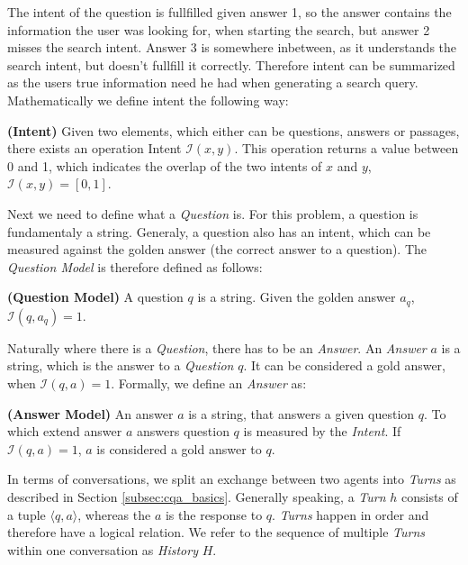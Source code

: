 The intent of the question is fullfilled given answer 1, so the answer contains the information the user was looking for, when starting the search, but answer 2 misses the search intent. Answer 3 is somewhere inbetween, as it understands the search intent, but doesn't fullfill it correctly. Therefore intent can be summarized as the users true information need he had when generating a search query. Mathematically we define intent the following way:

\begin{definition}
    \textbf{(Intent)} Given two elements, which either can be questions, answers or passages, there exists an operation Intent $\mathcal{I}(x, y)$. This operation returns a value between 0 and 1, which indicates the overlap of the two intents of $x$ and $y$, $\mathcal{I}(x, y) = [0,1]$.
    \label{def:intent}
\end{definition}

Next we need to define what a \textit{Question} is. For this problem, a question is fundamentaly a string. Generaly, a question also has an intent, which can be measured against the golden answer (the correct answer to a question). The \textit{Question Model} is therefore defined as follows:

\begin{definition}
    \textbf{(Question Model)} A question $q$ is a string. Given the golden answer $a_q$, $\mathcal{I}(q, a_q) = 1$.
    \label{def:question_model}
\end{definition}

Naturally where there is a \textit{Question}, there has to be an \textit{Answer}. An \textit{Answer} $a$ is a string, which is the answer to a \textit{Question} $q$. It can be considered a gold answer, when $\mathcal{I}(q,a) = 1$. Formally, we define an \textit{Answer} as:

\begin{definition}
    \textbf{(Answer Model)} An answer $a$ is a string, that answers a given question $q$. To which extend answer $a$ answers question $q$ is measured by the \textit{Intent}. If $\mathcal{I}(q,a) = 1$, $a$ is considered a gold answer to $q$.
    \label{def:answer_model}
\end{definition}

In terms of conversations, we split an exchange between two agents into \textit{Turns} as described in Section \ref{subsec:cqa_basics}. Generally speaking, a \textit{Turn} $h$ consists of a tuple $\langle q,a\rangle$, whereas the $a$ is the response to $q$. \textit{Turns} happen in order and therefore have a logical relation. We refer to the sequence of multiple \textit{Turns} within one conversation as \textit{History} $H$.

